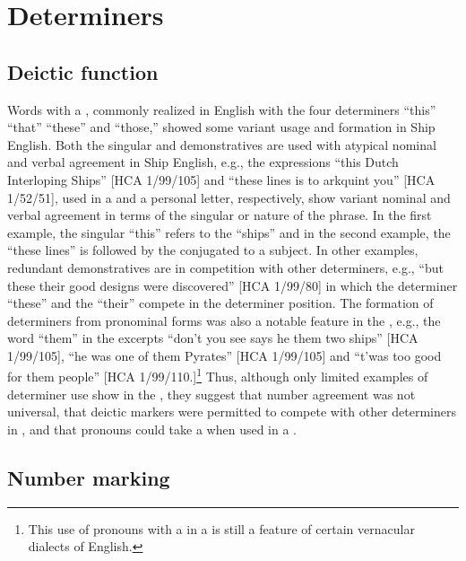 \section{{Determiners}}%

\subsection{{Deictic function}}%

Words with a , commonly realized in English with the four  determiners “this” “that” “these” and “those,” showed some variant usage and formation in Ship English. Both the singular and  demonstratives are used with atypical nominal and verbal agreement in Ship English, e.g., the expressions “this Dutch Interloping Ships” [HCA 1/99/105] and “these lines is to arkquint you” [HCA 1/52/51], used in a  and a personal letter, respectively, show variant nominal and verbal agreement in terms of the singular or  nature of the  phrase. In the first example, the singular  “this” refers to the   “ships” and in the second example, the    “these lines” is followed by the   conjugated to a  subject. In other examples, redundant demonstratives are in competition with other determiners, e.g., “but these their good designs were discovered” [HCA 1/99/80] in which the determiner “these” and the  “their” compete in the determiner position. The formation of  determiners from  pronominal forms was also a notable feature in the , e.g., the word “them” in the excerpts “don’t you see says he them two ships” [HCA 1/99/105], “he was one of them Pyrates” [HCA 1/99/105] and “t’was too good for them people” [HCA 1/99/110.]\footnote{This use of  pronouns with a  in a  is still a feature of certain vernacular dialects of English.} Thus, although only limited examples of determiner use show in the , they suggest that  number agreement was not universal, that deictic markers were permitted to compete with other determiners in , and that  pronouns could take a  when used in a .  

\subsection{{Number marking}}%

